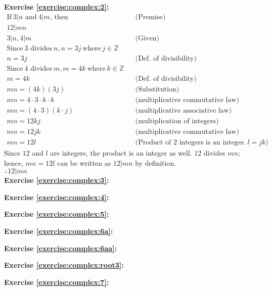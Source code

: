 \noindent\textbf{Exercise \ref{exercise:complex:2}:} %
\begin{align*}
\text{If}\  3|n \text{\ and}\  4|m\text{, then}\ &		&\text{(Premise)}\\
12|mn&		\\
3|n, 4|m&		&\text{(Given)}\\
\text{Since}\ 3 \text{\ divides} \ n, n = 3j\ \text{where}\ j \in {\mathbb{Z}}\\
n = 3j&		&\text{(Def. of divisibility)}\\
\text{Since}\ 4 \text{\ divides} \ m, m = 4k\ \text{where}\ k \in {\mathbb{Z}}\\
m = 4k&	&\text{(Def. of divisibility)}\\
mn = (4k)(3j)&	&\text{(Substitution)}\\
mn = 4 \cdot 3 \cdot k \cdot k&	&\text{(multiplicative commutative law)}\\
mn = (4 \cdot 3)(k \cdot j)&	&\text{(multiplicative associative law)}\\
mn = 12kj&	&\text{(multiplication of integers)}\\
mn = 12jk&	&\text{(multiplicative commutative law)}\\
mn = 12l&	&\text{(Product of 2 integers is an integer.}\ l = jk)
\end{align*}
Since $12$ and $l$ are integers, the product is an integer as well. $12$ divides $mn$; hence, $mn = 12l$ can be written as $12|mn$ by definition.\\
$\therefore 12|mn$\\

\noindent\textbf{Exercise \ref{exercise:complex:3}:}

\noindent\textbf{Exercise \ref{exercise:complex:4}:}

\noindent\textbf{Exercise \ref{exercise:complex:5}:}

\noindent\textbf{Exercise \ref{exercise:complex:6a}:}

\noindent\textbf{Exercise \ref{exercise:complex:6aa}:}

\noindent\textbf{Exercise \ref{exercise:complex:root3}:}

\noindent\textbf{Exercise \ref{exercise:complex:7}:}

